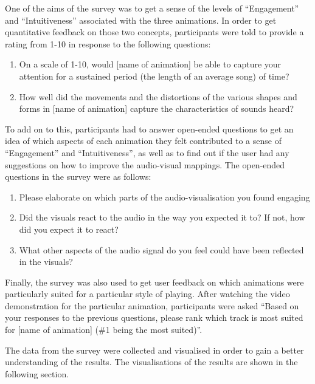 \documentclass[../initial_thesis.tex]{subfiles}
\begin{document}


One of the aims of the survey was to get a sense of the levels of ``Engagement'' and ``Intuitiveness'' associated with the three animations. In order to get quantitative feedback on those two concepts, participants were told to provide a rating from 1-10 in response to the following questions:

\begin{enumerate}
\item {On a scale of 1-10, would [name of animation] be able to capture your attention for a sustained period (the length of an average song) of time?}
\item {How well did the movements and the distortions of the various shapes and forms in [name of animation] capture the characteristics of sounds heard?}
\end{enumerate}

To add on to this, participants had to answer open-ended questions to get an idea of which aspects of each animation they felt contributed to a sense of ``Engagement'' and ``Intuitiveness'', as well as to find out if the user had any suggestions on how to improve the audio-visual mappings. The open-ended questions in the survey were as follows:

\begin{enumerate}
\item {Please elaborate on which parts of the audio-visualisation you found engaging}
\item {Did the visuals react to the audio in the way you expected it to? If not, how did you expect it to react?}
\item {What other aspects of the audio signal do you feel could have been reflected in the visuals?}
\end{enumerate}

Finally, the survey was also used to get user feedback on which animations were particularly suited for a particular style of playing. After watching the video demonstration for the particular animation, participants were asked ``Based on your responses to the previous questions, please rank which track is most suited for [name of animation] (\#1 being the most suited)''.

The data from the survey were collected and visualised in order to gain a better understanding of the results. The visualisations of the results are shown in the following section.
\end{document}
